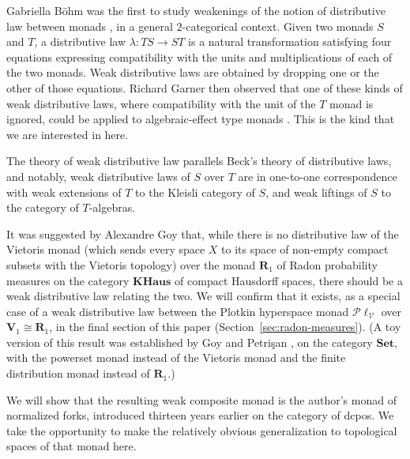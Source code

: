 \documentclass[preprint,12pt]{elsarticle}
\newcommand\Plotkin{\mathcal P\ell} %
\newcommand\Plotkinn{\Plotkin_{\mathcal V}}
\newcommand\Val{{\mathbf V}}
\newcommand\Setcat{\mathbf{Set}}
\begin{document}
Gabriella B\"ohm was the first to study weakenings of the notion of
distributive law between monads \cite{Bohm:weak:monads}, in a general
$2$-categorical context.  Given two monads $S$ and $T$, a distributive
law $\lambda \colon TS \to ST$ is a natural transformation satisfying
four equations expressing compatibility with the units and
multiplications of each of the two monads.  Weak distributive laws are
obtained by dropping one or the other of those equations.  Richard
Garner then observed that one of these kinds of weak distributive
laws, where compatibility with the unit of the $T$ monad is ignored,
could be applied to algebraic-effect type monads
\cite{Garner:weak:distr}.  This is the kind that we are interested in
here.

The theory of weak distributive law parallels Beck's theory of
distributive laws, and notably, weak distributive laws of $S$ over $T$
are in one-to-one correspondence with weak extensions of $T$ to the
Kleisli category of $S$, and weak liftings of $S$ to the category of
$T$-algebras.

It was suggested by Alexandre Goy \cite[Chapter~7]{Goy:PhD} that,
while there is no distributive law of the Vietoris monad (which sends
every space $X$ to its space of non-empty compact subsets with the
Vietoris topology) over the monad $\mathbf R_1$ of Radon probability
measures on the category $\mathbf{KHaus}$ of compact Hausdorff spaces,
there should be a weak distributive law relating the two.  We will
confirm that it exists, as a special case of a weak distributive law
between the Plotkin hyperspace monad $\Plotkinn$ over
$\Val_1 \cong \mathbf R_1$, in the final section of this paper
(Section~\ref{sec:radon-measures}).  (A toy version of this result was
established by Goy and Petri\c san \cite{goypetr-dp}, on the category
$\Setcat$, with the powerset monad instead of the Vietoris monad and
the finite distribution monad instead of $\mathbf R_1$.)

We will show that the resulting weak composite monad is the author's
monad of normalized forks, introduced thirteen years earlier
\cite{Gou-csl07} on the category of dcpos.  We take the opportunity to
make the relatively obvious generalization to topological spaces of
that monad here.
\end{document}
